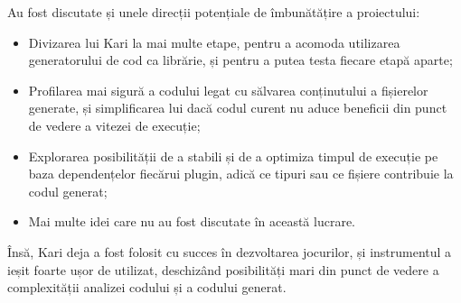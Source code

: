 \documentclass{report}
\begin{document}
Au fost discutate și unele direcții potențiale de îmbunătățire a proiectului:

\begin{itemize}
  \item Divizarea lui Kari la mai multe etape, pentru a acomoda utilizarea generatorului de cod ca librărie, și pentru a putea testa fiecare etapă aparte;
  \item Profilarea mai sigură a codului legat cu sălvarea conținutului a fișierelor generate, și simplificarea lui dacă codul curent nu aduce beneficii din punct de vedere a vitezei de execuție;
  \item Explorarea posibilității de a stabili și de a optimiza timpul de execuție pe baza dependențelor fiecărui plugin, adică ce tipuri sau ce fișiere contribuie la codul generat;
  \item Mai multe idei care nu au fost discutate în această lucrare.
\end{itemize}

Însă, Kari deja a fost folosit cu succes în dezvoltarea jocurilor, și instrumentul a ieșit foarte ușor de utilizat, deschizând posibilități mari din punct de vedere a complexității analizei codului și a codului generat.
\end{document}
